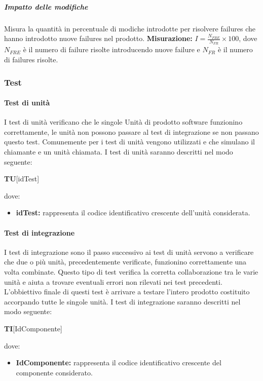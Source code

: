 \subparagraph{Impatto delle modifiche} \Spazio
Misura la quantità in percentuale di modiche introdotte per risolvere failures che hanno introdotto nuove failures nel prodotto.
\textbf{Misurazione:} $I=\frac{N_{FRE}}{N_{FR}}\times 100 $, dove $N_{FRE}$ è il numero di failure risolte introducendo nuove failure e $N_{FR}$ è il numero di failures risolte. 
	
\subsubsection{Test}
\paragraph{Test di unità} \Spazio
I test di unità verificano che le singole Unità di prodotto software funzionino correttamente, le unità non possono passare al test di integrazione se non passano questo test.
Comunemente per i test di unità vengono utilizzati  e  che simulano il chiamante e un unità chiamata.\newline
I test di unità saranno descritti nel modo seguente: \Spazio

\centerline{\textbf{TU}[idTest]}

dove:
\begin{itemize}
	\item \textbf{idTest:} rappresenta il codice identificativo crescente dell’unità considerata.
\end{itemize}
\paragraph{Test di integrazione} \Spazio
I test di integrazione sono il passo successivo ai test di unità servono a verificare che due o più unità, precedentemente verificate, funzionino correttamente una volta combinate.
Questo tipo di test verifica la corretta collaborazione tra le varie unità e aiuta a trovare eventuali errori non rilevati nei test precedenti.
L'obbiettivo finale di questi test è arrivare a testare l'intero prodotto costituito accorpando tutte le singole unità.\newline
I test di integrazione saranno descritti nel modo seguente: \Spazio
\centerline{\textbf{TI}[IdComponente]}

dove:
\begin{itemize}
	\item \textbf{IdComponente:} rappresenta il codice identificativo crescente del componente considerato.
\end{itemize}

